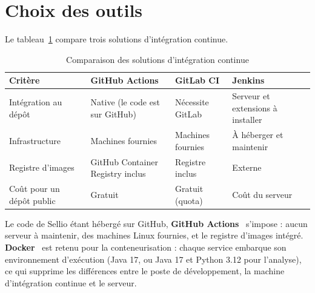 \section{Choix des outils}
Le tableau~\ref{tab:choix-ci} compare trois solutions d'intégration continue.
\begin{table}[H]
\centering
\renewcommand{\arraystretch}{1.35}
\small
\begin{tabular}{|p{3.6cm}|p{3.7cm}|p{3.7cm}|p{3.7cm}|}
\hline
\textbf{Critère} & \textbf{GitHub Actions} & \textbf{GitLab CI} & \textbf{Jenkins} \\
\hline
Intégration au dépôt & Native (le code est sur GitHub) & Nécessite GitLab & Serveur et extensions à installer \\
\hline
Infrastructure & Machines fournies & Machines fournies & À héberger et maintenir \\
\hline
Registre d'images & GitHub Container Registry inclus & Registre inclus & Externe \\
\hline
Coût pour un dépôt public & Gratuit & Gratuit (quota) & Coût du serveur \\
\hline
\end{tabular}
\caption{Comparaison des solutions d'intégration continue}
\label{tab:choix-ci}
\end{table}
Le code de Sellio étant hébergé sur GitHub, \textbf{GitHub Actions}~\cite{githubactions} s'impose : aucun serveur à maintenir, des machines Linux fournies, et le registre d'images intégré. \textbf{Docker}~\cite{docker} est retenu pour la conteneurisation : chaque service embarque son environnement d'exécution (Java 17, ou Java 17 et Python 3.12 pour l'analyse), ce qui supprime les différences entre le poste de développement, la machine d'intégration continue et le serveur.

